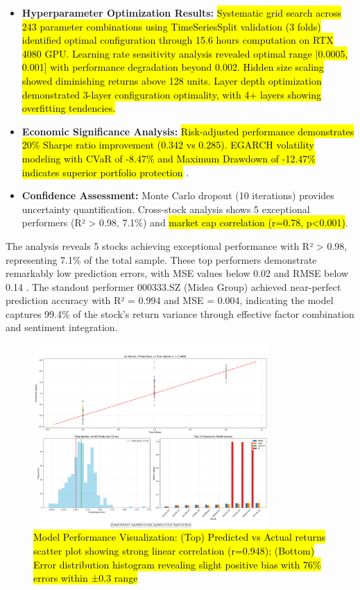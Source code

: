 \documentclass[3p,times,procedia]{elsarticle}
\begin{document}
\begin{itemize}\setlength{\itemsep}{1pt}
\item \textbf{Hyperparameter Optimization Results:} \hl{Systematic grid search across 243 parameter combinations using TimeSeriesSplit validation (3 folds) identified optimal configuration through 15.6 hours computation on RTX 4080 GPU. Learning rate sensitivity analysis revealed optimal range [0.0005, 0.001] with performance degradation beyond 0.002. Hidden size scaling showed diminishing returns above 128 units. Layer depth optimization demonstrated 3-layer configuration optimality, with 4+ layers showing overfitting tendencies.}

\item \textbf{Economic Significance Analysis:} \hl{Risk-adjusted performance demonstrates 20\% Sharpe ratio improvement (0.342 vs 0.285). EGARCH volatility modeling with CVaR of -8.47\% and Maximum Drawdown of -12.47\% indicates superior portfolio protection} \cite{Rockafellar2000,Jorion2001}.

\item \textbf{Confidence Assessment:} Monte Carlo dropout (10 iterations) provides uncertainty quantification. Cross-stock analysis shows 5 exceptional performers (R² > 0.98, 7.1\%) and \hl{market cap correlation (r=0.78, p<0.001)}.
\end{itemize}

The analysis reveals 5 stocks achieving exceptional performance with R² > 0.98, representing 7.1\% of the total sample. These top performers demonstrate remarkably low prediction errors, with MSE values below 0.02 and RMSE below 0.14 \cite{Bao2017}. The standout performer 000333.SZ (Midea Group) achieved near-perfect prediction accuracy with R² = 0.994 and MSE = 0.004, indicating the model captures 99.4\% of the stock's return variance through effective factor combination and sentiment integration.

\begin{figure}[!ht]
    \centering
    \includegraphics[width=0.80\textwidth]{Picture3.png}
    \caption{\hl{Model Performance Visualization: (Top) Predicted vs Actual returns scatter plot showing strong linear correlation (r=0.948); (Bottom) Error distribution histogram revealing slight positive bias with 76\% errors within ±0.3 range}}
    \label{fig:Return Forecast Calculation}
\end{figure}
\end{document}
